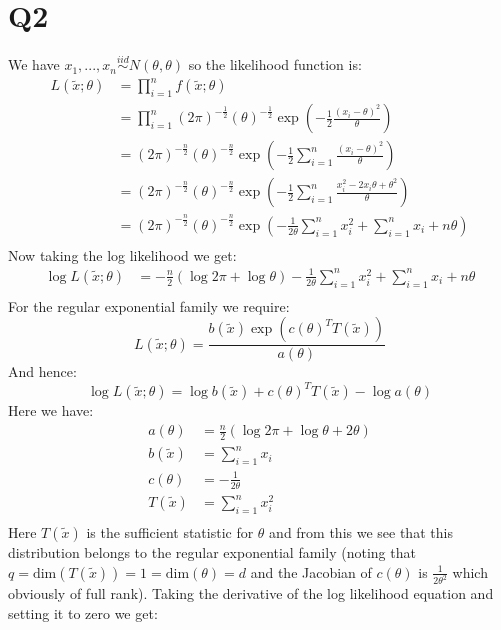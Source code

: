 \documentclass{article}
\begin{document}
\section*{Q2}
We have $x_1,...,x_n\stackrel{iid}{\sim}N(\theta,\theta)$ so the likelihood function is:
\begin{align*}
L(\tilde{x};\theta)&=\prod_{i=1}^{n}f(\tilde{x};\theta)\\
&=\prod_{i=1}^{n}(2\pi)^{-\frac{1}{2}}(\theta)^{-\frac{1}{2}}\exp\left(-\frac{1}{2}\frac{(x_i-\theta)^2}{\theta}\right)\\
&=(2\pi)^{-\frac{n}{2}}(\theta)^{-\frac{n}{2}}\exp\left(-\frac{1}{2}\sum_{i=1}^{n}\frac{(x_i-\theta)^2}{\theta}\right)\\
&=(2\pi)^{-\frac{n}{2}}(\theta)^{-\frac{n}{2}}\exp\left(-\frac{1}{2}\sum_{i=1}^{n}\frac{x_i^2-2x_i\theta+\theta^2}{\theta}\right)\\
&=(2\pi)^{-\frac{n}{2}}(\theta)^{-\frac{n}{2}}\exp\left(-\frac{1}{2\theta}\sum_{i=1}^{n}x_i^2+\sum_{i=1}^{n}x_i+n\theta\right)\\
\end{align*}
Now taking the log likelihood we get:
\begin{align*}
\log L(\tilde{x};\theta)&=-\frac{n}{2}\left(\log 2\pi +\log\theta\right)-\frac{1}{2\theta}\sum_{i=1}^{n}x_i^2+\sum_{i=1}^{n}x_i+n\theta\\
\end{align*}
For the regular exponential family we require:
$$L(\tilde{x};\theta)=\frac{b(\tilde{x})\exp(c(\theta)^TT(\tilde{x}))}{a(\theta)}$$
And hence:
$$\log L(\tilde{x};\theta)=\log b(\tilde{x})+c(\theta)^TT(\tilde{x})-\log a(\theta)$$
Here we have:
\begin{align*}
a(\theta)&=\frac{n}{2}(\log2\pi+\log\theta+2\theta)\\
b(\tilde{x})&=\sum_{i=1}^{n}x_i\\
c(\theta)&=-\frac{1}{2\theta}\\
T(\tilde{x})&=\sum_{i=1}^{n}x_i^2\\
\end{align*}
Here $T(\tilde{x})$ is the sufficient statistic for $\theta$ and from this we see that this distribution belongs to the regular exponential family (noting that $q=\text{dim}(T(\tilde{x}))=1=\text{dim}(\theta)=d$ and the Jacobian of $c(\theta)$ is $\frac{1}{2\theta^2}$ which obviously of full rank).
\newline\newline
Taking the derivative of the log likelihood equation and setting it to zero  we get:
\end{document}
